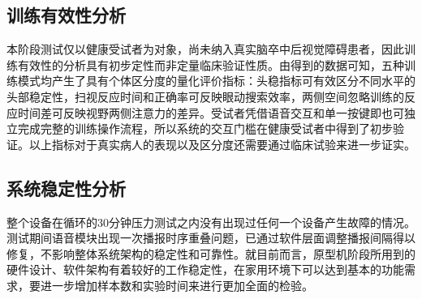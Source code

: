\subsection{训练有效性分析}

本阶段测试仅以健康受试者为对象，尚未纳入真实脑卒中后视觉障碍患者，因此训练有效性的分析具有初步定性而非定量临床验证性质。由得到的数据可知，五种训练模式均产生了具有个体区分度的量化评价指标：头稳指标可有效区分不同水平的头部稳定性，扫视反应时间和正确率可反映眼动搜索效率，两侧空间忽略训练的反应时间差可反映视野两侧注意力的差异。受试者凭借语音交互和单一按键即也可独立完成完整的训练操作流程，所以系统的交互门槛在健康受试者中得到了初步验证。以上指标对于真实病人的表现以及区分度还需要通过临床试验来进一步证实。

\subsection{系统稳定性分析}

整个设备在循环的30分钟压力测试之内没有出现过任何一个设备产生故障的情况。测试期间语音模块出现一次播报时序重叠问题，已通过软件层面调整播报间隔得以修复，不影响整体系统架构的稳定性和可靠性。就目前而言，原型机阶段所用到的硬件设计、软件架构有着较好的工作稳定性，在家用环境下可以达到基本的功能需求，要进一步增加样本数和实验时间来进行更加全面的检验。
